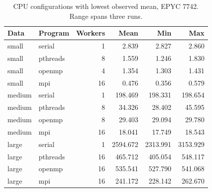 \begin{table}[t]
\centering\caption{CPU configurations with lowest observed mean, EPYC 7742. Range spans three runs.}\label{tab:cpu}
\small\setlength{\tabcolsep}{3pt}\begin{tabular}{llrrrr}\toprule
Data & Program & Workers & Mean & Min & Max \\
\midrule
small & serial & 1 & 2.839 & 2.827 & 2.860 \\
small & pthreads & 8 & 1.559 & 1.246 & 1.830 \\
small & openmp & 4 & 1.354 & 1.303 & 1.431 \\
small & mpi & 16 & 0.476 & 0.356 & 0.579 \\
medium & serial & 1 & 198.469 & 198.331 & 198.654 \\
medium & pthreads & 8 & 34.326 & 28.402 & 45.595 \\
medium & openmp & 8 & 29.403 & 29.094 & 29.780 \\
medium & mpi & 16 & 18.041 & 17.749 & 18.543 \\
large & serial & 1 & 2594.672 & 2313.991 & 3153.929 \\
large & pthreads & 16 & 465.712 & 405.054 & 548.117 \\
large & openmp & 16 & 535.541 & 527.790 & 541.068 \\
large & mpi & 16 & 241.172 & 228.142 & 262.670 \\
\bottomrule\end{tabular}
\end{table}
